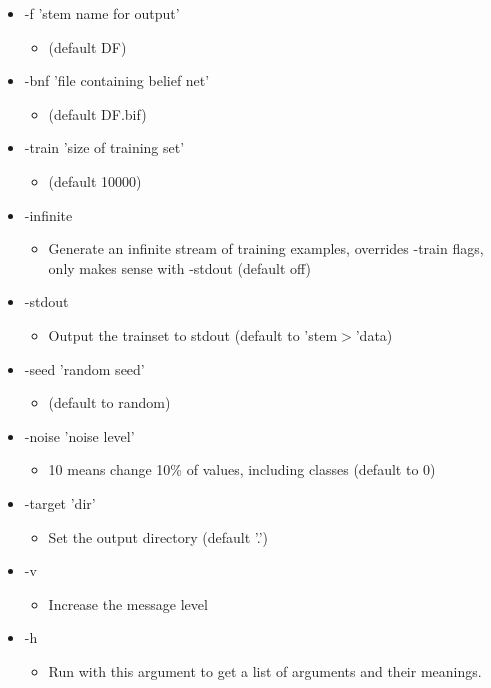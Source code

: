 \begin{itemize}
\item -f 'stem name for output'\begin{itemize}
\item (default DF)\end{itemize}
\item -bnf 'file containing belief net'\begin{itemize}
\item (default DF.bif)\end{itemize}
\item -train 'size of training set'\begin{itemize}
\item (default 10000)\end{itemize}
\item -infinite\begin{itemize}
\item Generate an infinite stream of training examples, overrides -train flags, only makes sense with -stdout (default off)\end{itemize}
\item -stdout\begin{itemize}
\item Output the trainset to stdout (default to 'stem$>$'data)\end{itemize}
\item -seed 'random seed'\begin{itemize}
\item (default to random)\end{itemize}
\item -noise 'noise level'\begin{itemize}
\item 10 means change 10\% of values, including classes (default to 0)\end{itemize}
\item -target 'dir'\begin{itemize}
\item Set the output directory (default '.')\end{itemize}
\item -v\begin{itemize}
\item Increase the message level\end{itemize}
\item -h\begin{itemize}
\item Run with this argument to get a list of arguments and their meanings.\par
\end{itemize}
\end{itemize}


